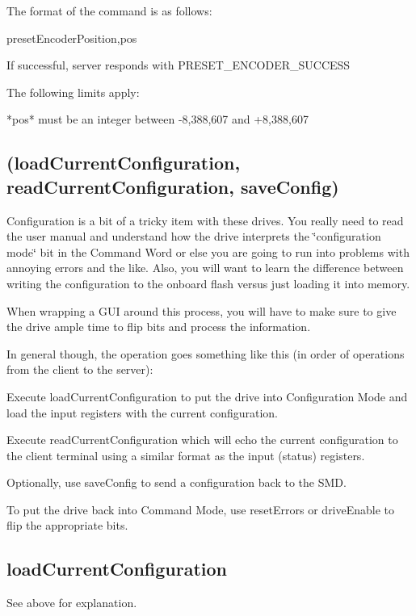 The format of the command is as follows\+:

{\ttfamily preset\+Encoder\+Position,pos}

If successful, server responds with {\ttfamily P\+R\+E\+S\+E\+T\+\_\+\+E\+N\+C\+O\+D\+E\+R\+\_\+\+S\+U\+C\+C\+E\+S\+S}

The following limits apply\+: \begin{DoxyVerb}*pos* must be an integer between -8,388,607 and +8,388,607
\end{DoxyVerb}
\hypertarget{index_Configuration}{}\subsection{(load\+Current\+Configuration, read\+Current\+Configuration, save\+Config)}\label{index_Configuration}
Configuration is a bit of a tricky item with these drives. You really need to read the user manual and understand how the drive interprets the \char`\"{}configuration mode\char`\"{} bit in the Command Word or else you are going to run into problems with annoying errors and the like. Also, you will want to learn the difference between writing the configuration to the onboard flash versus just loading it into memory.

When wrapping a G\+U\+I around this process, you will have to make sure to give the drive ample time to flip bits and process the information.

In general though, the operation goes something like this (in order of operations from the client to the server)\+:


\begin{DoxyEnumerate}
\item Execute {\ttfamily load\+Current\+Configuration} to put the drive into Configuration Mode and load the input registers with the current configuration.
\item Execute {\ttfamily read\+Current\+Configuration} which will echo the current configuration to the client terminal using a similar format as the input (status) registers.
\item Optionally, use save\+Config to send a configuration back to the S\+M\+D.
\item To put the drive back into Command Mode, use {\ttfamily reset\+Errors} or {\ttfamily drive\+Enable} to flip the appropriate bits.
\end{DoxyEnumerate}\hypertarget{index_loadCurrentConfiguration}{}\subsection{load\+Current\+Configuration}\label{index_loadCurrentConfiguration}
See above for explanation.

